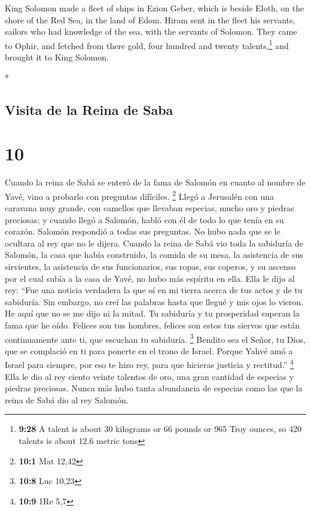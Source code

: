 \begin{paracol}{2}
\begin{otherlanguage}{english}
 King Solomon made a fleet of ships in Ezion Geber, which
is beside Eloth, on the shore of the Red Sea, in the land of Edom.
 Hiram sent in the fleet his servants, sailors who had
knowledge of the sea, with the servants of Solomon.  They
came to Ophir, and fetched from there gold, four hundred and twenty
talents,\footnote{\textbf{9:28} A talent is about 30 kilograms or 66
  pounds or 965 Troy ounces, so 420 talents is about 12.6 metric tons}
and brought it to King Solomon.

\end{otherlanguage}

\switchcolumn[0]*

\hypertarget{visita-de-la-reina-de-saba}{%
\subsection{Visita de la Reina de
Saba}\label{visita-de-la-reina-de-saba}}

\hypertarget{section-18}{%
\section{10}\label{section-18}}

 Cuando la reina de Sabá se enteró de la fama de Salomón
en cuanto al nombre de Yavé, vino a probarlo con preguntas difíciles.
\footnote{\textbf{10:1} Mat 12,42}  Llegó a Jerusalén con
una caravana muy grande, con camellos que llevaban especias, mucho oro y
piedras preciosas; y cuando llegó a Salomón, habló con él de todo lo que
tenía en su corazón.  Salomón respondió a todas sus
preguntas. No hubo nada que se le ocultara al rey que no le dijera.
 Cuando la reina de Sabá vio toda la sabiduría de Salomón,
la casa que había construido,  la comida de su mesa, la
asistencia de sus sirvientes, la asistencia de sus funcionarios, sus
ropas, sus coperos, y su ascenso por el cual subía a la casa de Yavé, no
hubo más espíritu en ella.  Ella le dijo al rey: ``Fue una
noticia verdadera la que oí en mi tierra acerca de tus actos y de tu
sabiduría.  Sin embargo, no creí las palabras hasta que
llegué y mis ojos lo vieron. He aquí que no se me dijo ni la mitad. Tu
sabiduría y tu prosperidad superan la fama que he oído. 
Felices son tus hombres, felices son estos tus siervos que están
continuamente ante ti, que escuchan tu sabiduría. \footnote{\textbf{10:8}
  Luc 10,23}  Bendito sea el Señor, tu Dios, que se
complació en ti para ponerte en el trono de Israel. Porque Yahvé amó a
Israel para siempre, por eso te hizo rey, para que hicieras justicia y
rectitud.'' \footnote{\textbf{10:9} 1Re 5,7}  Ella le dio
al rey ciento veinte talentos de oro, una gran cantidad de especias y
piedras preciosas. Nunca más hubo tanta abundancia de especias como las
que la reina de Sabá dio al rey Salomón.


\end{paracol}
